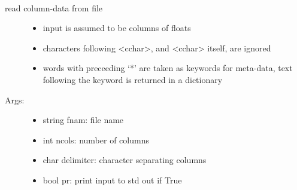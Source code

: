 \documentclass[letterpaper,10pt,english]{sphinxmanual}
\begin{document}

\begin{fulllineitems}
\label{\detokenize{index:PhyPraKit.PhyPraKit.readColumnData}}~\begin{description}
\item[{read column-data from file}] \leavevmode\begin{itemize}
\item {} 
input is assumed to be columns of floats

\item {} 
characters following \textless{}cchar\textgreater{}, and \textless{}cchar\textgreater{} itself, are ignored

\item {} 
words with preceeding `*' are taken as keywords for meta-data,
text following the keyword is returned in a dictionary

\end{itemize}

\item[{Args:}] \leavevmode\begin{itemize}
\item {} 
string fnam:      file name

\item {} 
int ncols:        number of columns

\item {} 
char delimiter:   character separating columns

\item {} 
bool pr:          print input to std out if True

\end{itemize}

\end{description}

\end{fulllineitems}

\end{document}
